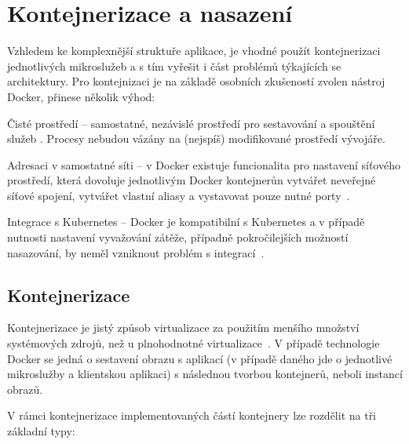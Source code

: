 \chapter{Kontejnerizace a nasazení}\label{ch:deployment}


Vzhledem ke komplexnější struktuře aplikace, je vhodné použít kontejnerizaci jednotlivých mikroslužeb a s tím vyřešit i část problémů týkajících se architektury.
Pro kontejnizaci je na základě osobních zkušeností zvolen nástroj Docker, přinese několik výhod:

\begin{dl}
   \item[Čisté prostředí] – samostatné, nezávislé prostředí pro sestavování a spouštění služeb .
   Procesy nebudou vázány na (nejspíš) modifikované prostředí vývojáře.
   \item[Adresaci v samostatné síti] – v Docker existuje funcionalita pro nastavení síťového prostředí, která dovoluje jednotlivým Docker kontejnerůn vytvářet neveřejné síťové spojení, vytvářet vlastní aliasy a vystavovat pouze nutné porty~\cite{dockernetwork}.
   \item[Integrace s Kubernetes] – Docker je kompatibilní s Kubernetes a v případě nutnosti nastavení vyvažování zátěže, případně pokročilejších možností nasazování, by neměl vzniknout problém s integrací~\cite{dockerkubernetes}.
\end{dl}


\newpage



\section{Kontejnerizace}\label{sec:contenerization}

Kontejnerizace je jistý způsob virtualizace za použitím menšího množství systémových zdrojů, než u plnohodnotné virtualizace~\cite{kontejnerizace}.
V případě technologie Docker se jedná o sestavení obrazu s aplikací (v případě daného  jde o jednotlivé mikroslužby a klientskou aplikaci) s následnou tvorbou kontejnerů, neboli instancí obrazů.

V rámci kontejnerizace implementovaných částí kontejnery lze rozdělit na tři základní typy:

